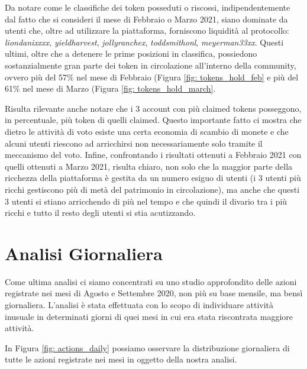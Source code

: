 
Da notare come le classifiche dei token posseduti o riscossi, indipendentemente dal fatto che si consideri il mese di Febbraio o Marzo 2021, siano dominate da utenti che, oltre ad utilizzare la piattaforma, forniscono liquidità al protocollo: \textit{liondanixxxx}, \textit{yieldharvest}, \textit{jollyranchex}, \textit{toddsmithonl}, \textit{meyerman33xx}. Questi ultimi, oltre che a detenere le prime posizioni in classifica, possiedono sostanzialmente gran parte dei token in circolazione all'interno della community, ovvero più del 57\% nel mese di Febbraio (Figura \ref{fig: tokens_hold_feb} e più del 61\% nel mese di Marzo (Figura \ref{fig: tokens_hold_march}.

Risulta rilevante anche notare che i 3 account con più claimed tokens posseggono, in percentuale, più token di quelli claimed.
Questo importante fatto ci mostra che dietro le attività di voto esiste una certa economia di scambio di monete e che alcuni utenti riescono ad arricchirsi non necessariamente solo tramite il meccanismo del voto.
Infine, confrontando i risultati ottenuti a Febbraio 2021 con quelli ottenuti a Marzo 2021, risulta chiaro, non solo che la maggior parte della ricchezza della piattaforma è gestita da un numero esiguo di utenti (i 3 utenti più ricchi gestiscono più di metà del patrimonio in circolazione), ma anche che questi 3 utenti si stiano arricchendo di più nel tempo e che quindi il divario tra i più ricchi e tutto il resto degli utenti si stia acutizzando.

\section{Analisi Giornaliera}
Come ultima analisi ci siamo concentrati su uno studio approfondito delle azioni registrate nei mesi di Agosto e Settembre 2020, non più su base mensile, ma bensì giornaliera. L'analisi è stata effettuata con lo scopo di individuare attività inusuale in determinati giorni di quei mesi in cui era stata riscontrata maggiore attività.


In Figura \ref{fig: actions_daily} possiamo osservare la distribuzione giornaliera di tutte le azioni registrate nei mesi in oggetto della nostra analisi.

